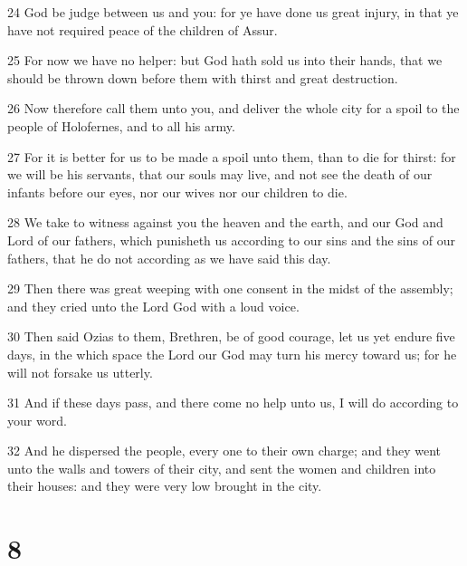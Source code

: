 \par 24 God be judge between us and you: for ye have done us great injury, in that ye have not required peace of the children of Assur.
\par 25 For now we have no helper: but God hath sold us into their hands, that we should be thrown down before them with thirst and great destruction.
\par 26 Now therefore call them unto you, and deliver the whole city for a spoil to the people of Holofernes, and to all his army.
\par 27 For it is better for us to be made a spoil unto them, than to die for thirst: for we will be his servants, that our souls may live, and not see the death of our infants before our eyes, nor our wives nor our children to die.
\par 28 We take to witness against you the heaven and the earth, and our God and Lord of our fathers, which punisheth us according to our sins and the sins of our fathers, that he do not according as we have said this day.
\par 29 Then there was great weeping with one consent in the midst of the assembly; and they cried unto the Lord God with a loud voice.
\par 30 Then said Ozias to them, Brethren, be of good courage, let us yet endure five days, in the which space the Lord our God may turn his mercy toward us; for he will not forsake us utterly.
\par 31 And if these days pass, and there come no help unto us, I will do according to your word.
\par 32 And he dispersed the people, every one to their own charge; and they went unto the walls and towers of their city, and sent the women and children into their houses: and they were very low brought in the city.

\chapter{8}

